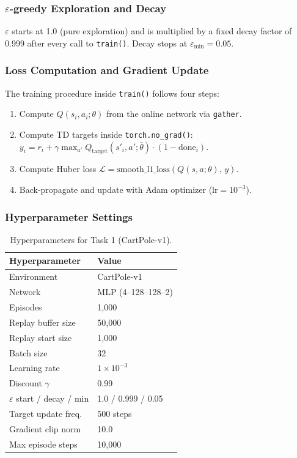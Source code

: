 \documentclass[12pt, a4paper]{report}
\begin{document}
\subsubsection*{$\varepsilon$-greedy Exploration and Decay}

$\varepsilon$ starts at 1.0 (pure exploration) and is multiplied by a fixed decay factor of 0.999
after every call to \texttt{train()}. Decay stops at $\varepsilon_\text{min} = 0.05$.

\subsubsection*{Loss Computation and Gradient Update}

The training procedure inside \texttt{train()} follows four steps:
\begin{enumerate}
  \item Compute $Q(s_i, a_i;\theta)$ from the online network via \texttt{gather}.
  \item Compute TD targets inside \texttt{torch.no\_grad()}: $y_i = r_i + \gamma \max_{a'} Q_\text{target}(s'_i,a';\bar{\theta})  \cdot (1-\text{done}_i)$.
  \item Compute Huber loss $\mathcal{L} = \text{smooth\_l1\_loss}(Q(s,a;\theta),\, y)$.
  \item Back-propagate and update with Adam optimizer ($\text{lr} = 10^{-3}$).
\end{enumerate}

\subsubsection*{Hyperparameter Settings}

\begin{table}[H]
\centering
\caption{Hyperparameters for Task 1 (CartPole-v1).}
\begin{tabular}{ll}
\toprule
\textbf{Hyperparameter} & \textbf{Value} \\
\midrule
Environment             & CartPole-v1 \\
Network                 & MLP (4--128--128--2) \\
Episodes                & 1{,}000 \\
Replay buffer size      & 50{,}000 \\
Replay start size       & 1{,}000 \\
Batch size              & 32 \\
Learning rate           & $1 \times 10^{-3}$ \\
Discount $\gamma$       & 0.99 \\
$\varepsilon$ start / decay / min & 1.0 / 0.999 / 0.05 \\
Target update freq.     & 500 steps \\
Gradient clip norm      & 10.0 \\
Max episode steps       & 10{,}000 \\
\bottomrule
\end{tabular}
\end{table}
\end{document}

